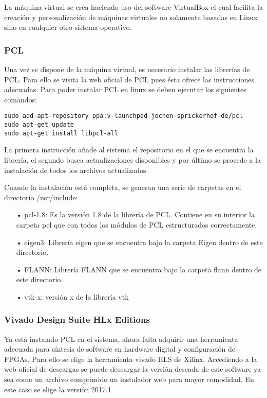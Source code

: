 La máquina virtual se crea haciendo uso del software VirtualBox\cite{virtualbox} el cual facilita la creación y personalización de máquinas virtuales no solamente basadas en Linux sino en cualquier otro sistema operativo.


\subsubsection{PCL}
Una vez se dispone de la máquina virtual, es necesario instalar las librerías de PCL\cite{pcl_installation}. Para ello se visita la web oficial de PCL pues ésta ofrece las instrucciones adecuadas. Para poder instalar PCL en linux se deben ejecutar los siguientes comandos:


\begin{verbatim}
sudo add-apt-repository ppa:v-launchpad-jochen-sprickerhof-de/pcl
sudo apt-get update
sudo apt-get install libpcl-all
\end{verbatim}

La primera instrucción añade al sistema el repositorio en el que se encuentra la librería, el segundo busca actualizaciones disponibles y por último se procede a la instalación de todos los archivos actualizados.

Cuando la instalación está completa, se generan una serie de carpetas en el directorio /usr/include:

\begin{itemize}
\item[•]pcl-1.8: Es la versión 1.8 de la librería de PCL. Contiene en su interior la carpeta pcl que con todos los módulos de PCL estructurados correctamente.
\item[•]eigen3: Librería eigen que se encuentra bajo la carpeta Eigen dentro de este directorio.
\item[•]FLANN: Librería FLANN que se encuentra bajo la carpeta flann dentro de este directorio.
\item[•]vtk-x: versión x de la librería vtk 
\end{itemize}

\subsubsection{Vivado Design Suite HLx Editions}
Ya está instalado PCL en el sistema, ahora falta adquirir una herramienta adecuada para síntesis de software en hardware digital y configuración de FPGAs. Para ello se elige la herramienta vivado HLS de Xilinx. Accediendo a la web oficial de descargas\cite{vivado_descarga} se puede descargar la versión deseada de este software ya sea como un archivo comprimido un instalador web para mayor comodidad. En este caso se elige la versión 2017.1

